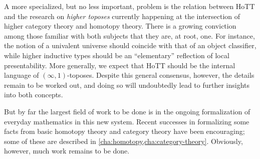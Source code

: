 A more specialized, but no less important, problem is the relation between HoTT and the research  on \emph{higher toposes} currently happening at the intersection of higher category theory and homotopy theory.
There is a growing conviction among those familiar with both subjects that they are, at root, one.
For instance, the notion of a univalent universe should coincide with that of an object classifier, while higher inductive types should be an ``elementary'' reflection of local presentability.
More generally, we expect that HoTT should be the internal language of $(\infty,1)$-toposes.
Despite this general consensus, however, the details remain to be worked out, and doing so will undoubtedly lead to further insights into both concepts.

But by far the largest field of work to be done is in the ongoing formalization of everyday mathematics in this new system.
Recent successes in formalizing some facts from basic homotopy theory and category theory have been encouraging; some of these are described in \cref{cha:homotopy,cha:category-theory}.
Obviously, however, much work remains to be done.

%


